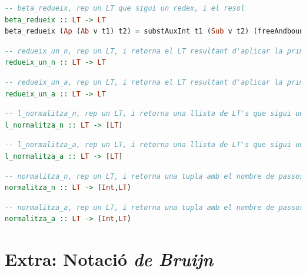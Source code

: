 \documentclass[10pt,a4paper]{article}
\begin{document}
\begin{lstlisting}[language=Haskell]
-- beta_redueix, rep un LT que sigui un redex, i el resol
beta_redueix :: LT -> LT
beta_redueix (Ap (Ab v t1) t2) = substAuxInt t1 (Sub v t2) (freeAndboundVars (Ab v t1))
\end{lstlisting}



\begin{lstlisting}[language=Haskell]
-- redueix_un_n, rep un LT, i retorna el LT resultant d'aplicar la primera beta-reduccio segons l'ordre normal
redueix_un_n :: LT -> LT
\end{lstlisting}



\begin{lstlisting}[language=Haskell]
-- redueix_un_a, rep un LT, i retorna el LT resultant d'aplicar la primera beta-reduccio segons l'ordre aplicatiu
redueix_un_a :: LT -> LT
\end{lstlisting}



\begin{lstlisting}[language=Haskell]
-- l_normalitza_n, rep un LT, i retorna una llista de LT's que sigui una sequencia de beta-reduccions, segons l'ordre normal
l_normalitza_n :: LT -> [LT]
\end{lstlisting}



\begin{lstlisting}[language=Haskell]
-- l_normalitza_a, rep un LT, i retorna una llista de LT's que sigui una sequencia de beta-reduccions, segons l'ordre aplicatiu
l_normalitza_a :: LT -> [LT]
\end{lstlisting}



\begin{lstlisting}[language=Haskell]
-- normalitza_n, rep un LT, i retorna una tupla amb el nombre de passos, mes el LT en forma normal, seguint l'ordre normal
normalitza_n :: LT -> (Int,LT)
\end{lstlisting}



\begin{lstlisting}[language=Haskell]
-- normalitza_a, rep un LT, i retorna una tupla amb el nombre de passos, mes el LT en forma normal, seguint l'ordre aplicatiu
normalitza_a :: LT -> (Int,LT)
\end{lstlisting}



\section{Extra: Notació \textit{de Bruijn}}
\end{document}
